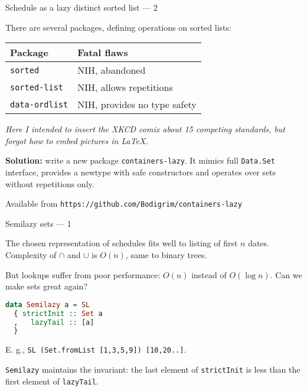 \documentclass[handout]{beamer}
\begin{document}
\begin{frame}{Schedule as a lazy distinct sorted list --- 2}

There are several
packages, defining operations on sorted lists:

\begin{table}[h]
\begin{tabular}{ll}
Package & Fatal flaws \\
\hline
{\tt sorted} & NIH, abandoned \\
{\tt sorted-list} & NIH, allows repetitions \\
{\tt data-ordlist} & NIH, provides no type safety \\
\end{tabular}
\end{table}

\pause
{\em Here I intended to insert the XKCD comix about 15 competing standards,
but forgot how to embed pictures in \LaTeX.}

\bigskip

\pause
{\bf Solution:} write a new package {\tt containers-lazy}.
It mimics full {\tt Data.Set} interface,
provides a newtype with safe constructors and
operates over sets without repetitions only.

\bigskip

\pause
Available from {\tt https://github.com/Bodigrim/containers-lazy}

\end{frame}

\begin{frame}[fragile]{Semilazy sets --- 1}

The chosen representation of schedules fits well to listing of first $n$ dates.
Complexity of $\cap$ and $\cup$ is $O(n)$,
same to binary trees.

\medskip

\pause
But lookups suffer
from poor performance: $O(n)$ instead of $O(\log n)$.
Can we make sets great again?

\pause

\begin{lstlisting}[language=Haskell]
data Semilazy a = SL
  { strictInit :: Set a
  ,   lazyTail :: [a]
  }
\end{lstlisting}

E. g., {\tt SL (Set.fromList [1,3,5,9]) [10,20..]}.

\medskip

\pause
{\tt Semilazy} maintains the invariant:
the last element of {\tt strictInit} is less than the first
element of {\tt lazyTail}.
\end{frame}
\end{document}
